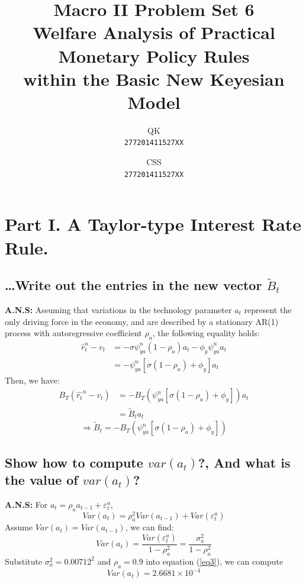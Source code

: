 \documentclass[12pt]{article}
\begin{document}
\title{
 \textbf{Macro II Problem Set 6 }\\
  \large Welfare Analysis of Practical Monetary Policy Rules\\
   within the Basic New Keyesian Model}

\author{
  QK\\
  \texttt{277201411527XX}
  \and
 CSS\\
  \texttt{277201411527XX}
}
\maketitle

\section{Part I. A Taylor-type Interest Rate Rule.}  %
\subsection{\dots Write out the entries in the new vector $\tilde{B}_{t}$} %
\normalsize{\textbf{A.N.S:}}
Assuming that variations in the technology parameter $a_t$ represent the only driving force in the economy, and are described by a stationary AR(1) process with autoregressive coefficient $\rho_a$, the following equality holds:
\begin{equation}
\begin{aligned}
\hat{r}_{t}^{n}-v_{t} &= -\sigma\psi^{n}_{ya}(1-\rho_{a})a_{t}-\phi_{y}\psi^{n}_{ya}a_{t}\\
&=-\psi^{n}_{ya}[\sigma(1-\rho_{a})+\phi_{y}]a_{t}
\end{aligned}
\end{equation}
Then, we have:
\begin{equation}
\begin{aligned}
B_{T}(\hat{r_{t}}^{n}-v_{t})&=-B_{T}(\psi^{n}_{ya}[\sigma(1-\rho_{a})+\phi_{y}])a_{t}\\
& = \tilde{B}_{t}a_{t}
\end{aligned}
\end{equation}
\[ \Longrightarrow   \tilde{B}_{t}= -B_{T}(\psi^{n}_{ya}[\sigma(1-\rho_{a})+\phi_{y}]) \]

\subsection{Show how to compute $var(a_t)$?, And what is the value of $var(a_t)$? }%
\textbf{A.N.S:} For $a_t=\rho_{a}a_{t-1}+\varepsilon_{t}^{a}$, 
\begin{equation*}
Var(a_t) = \rho_a^2 Var(a_{t-1})+Var(\varepsilon_{t}^{a})
\end{equation*}
Assume $Var(a_t) = Var(a_{t-1})$, we can find:
\begin{equation}
Var(a_{t}) = \frac{Var(\varepsilon_{t}^{a})}{1- \rho_a^2 } = \frac{\sigma_{a}^2}{1- \rho_a^2 } \label{eq3}
\end{equation}
Substitute $\sigma_{a}^2 = 0.00712^2$ and $\rho_a = 0.9$ into equation (\ref{eq3}), we can compute 
\[Var(a_{t})= 2.6681\times 10^{-4} \]
\end{document}
